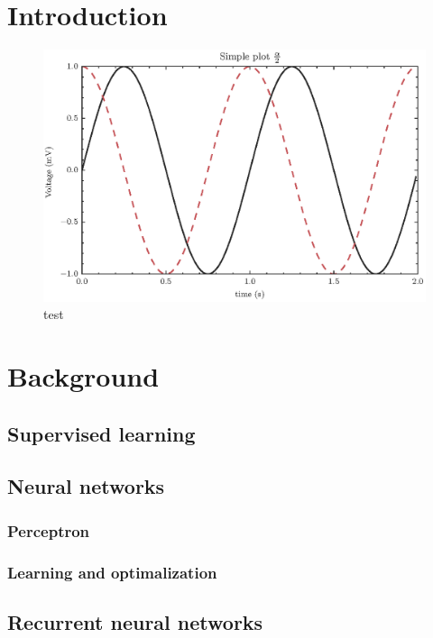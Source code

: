 \documentclass[a4paper, twoside]{article}
\begin{document}
\section{Introduction}
\label{sec:introduction}

\begin{figure}[h]
	\centering
	\includegraphics[width=0.8\linewidth]{./plot_data/test.eps}
	\caption{test}
	\label{fig:plot_data-test-eps}
\end{figure}


\section{Background}
\label{sec:background}

\subsection{Supervised learning}
\label{sub:supervised_learning}

\subsection{Neural networks}
\label{sub:neural_networks}

\subsubsection{Perceptron}
\label{ssub:perceptron}

\subsubsection{Learning and optimalization}
\label{ssub:learning_and_optimalization}

\subsection{Recurrent neural networks}
\label{sub:recurrent_neural_networks}
\end{document}
